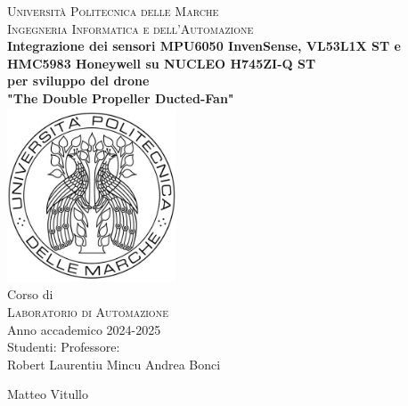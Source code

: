 \documentclass[11pt]{report}
\begin{document}


\begin{titlepage}
\begin{center}
\LARGE {\scshape{Università Politecnica delle Marche}}\\[0.5cm]
\LARGE {\scshape{Ingegneria Informatica e dell'Automazione}}\\[0.7cm]
\linespread{1}
\huge {\bfseries Integrazione dei sensori MPU6050 InvenSense, VL53L1X ST e HMC5983 Honeywell su NUCLEO H745ZI-Q ST}\\
\huge {\bfseries per sviluppo del drone}\\
\vspace{0.3cm}
\huge {\bfseries "The Double Propeller Ducted-Fan"}\\[1cm]
\linespread{1}
\includegraphics[width=5cm]{images/logoUnivpm.jpg}\\[0.5cm]
\linespread{1.2}
\Large Corso di\\
\Large {\scshape{Laboratorio di Automazione}} \\[0.3cm]
\Large {Anno accademico 2024-2025 \\[0.8cm]}
{\Large Studenti:}
\hfill {\Large Professore:}\\
{\Large Robert Laurentiu Mincu}
\hfill
{\Large Andrea Bonci}\\
\raggedright{\Large Matteo Vitullo\\}
\end{center}
\end{titlepage}
\end{document}
